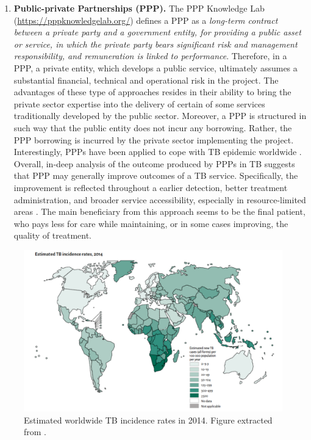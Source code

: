 \documentclass[11pt, b5paper,twoside]{tesi_upf}
\begin{document}
\begin{enumerate}
\item \textbf{Public-private Partnerships (PPP).} The PPP Knowledge Lab (\url{https://pppknowledgelab.org/}) defines a PPP as a \textit{long-term contract between a private party and a government entity, for providing a public asset or service, in which the private party bears significant risk and management responsibility, and remuneration is linked to performance}. Therefore, in a PPP, a private entity, which develops a public service, ultimately assumes a substantial financial, technical and operational risk in the project. The advantages of these type of approaches resides in their ability to bring the private sector expertise into the delivery of certain of some services traditionally developed by the public sector. Moreover, a PPP is structured in such way that the public entity does not incur any borrowing. Rather, the PPP borrowing is incurred by the private sector implementing the project. Interestingly,  PPPs have been applied to cope with TB epidemic worldwide \cite{Karki2007, Murthy2001}. Overall, in-deep analysis of the outcome produced by PPPs in TB suggests that PPP may generally improve outcomes of a TB service.  Specifically, the improvement is reflected throughout a earlier detection, better treatment administration, and broader service accessibility, especially in resource-limited areas \cite{Lei2015}. The main beneficiary from this approach seems to be the final patient, who pays less for care while maintaining, or in some cases improving, the quality of treatment. 

\end{enumerate}

\begin{figure}[htbp]
\centering
\includegraphics[width=0.9\linewidth]{../figures/map_incidence_tb.pdf}
	\caption[Estimated worldwide TB incidence rates in 2014]{Estimated worldwide TB incidence rates in 2014. Figure extracted from \cite{Lewandowski2015}.}
\label{fig:map_incidence_tb}
	
	\vspace*{4mm}
\end{figure}
\end{document}
